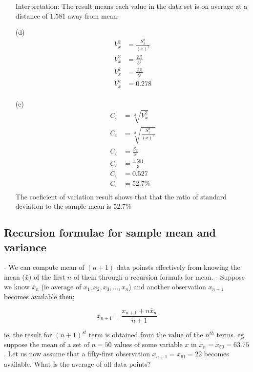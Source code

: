 \documentclass[12pt]{article}
\begin{document}
\begin{enumerate}
        Interpretation: The result means each value in the data set is on average at a distance of $1.581$ away from mean.
    \item[(d)]
        \begin{align*}
            V_x^2 & = \frac{S_x^2}{(\bar{x})^2} \\
            V_x^2 & = \frac{2.5}{3^2}           \\
            V_x^2 & = \frac{2.5}{9}             \\
            V_x^2 & = 0.278                     \\
        \end{align*}
    \item[(e)]
        \begin{align*}
            C_v & = \sqrt[2]{V_x^2}                     \\
            C_v & = \sqrt[2]{\frac{S_x^2}{(\bar{x})^2}} \\
            C_v & = \frac{S_x}{\bar{x}}                 \\
            C_v & = \frac{1.581}{3}                     \\
            C_v & = 0.527                               \\
            C_v & = 52.7\%                              \\
        \end{align*}
        The coeficient of variation result shows that that the ratio of standard deviation to the sample mean is $52.7\%$
\end{enumerate}
\subsection{Recursion formulae for sample mean and variance}
- We can compute mean of $(n + 1)$ data poinsts effectively from knowing the mean ($\bar{x}$) of the first $n$ of them through a recursion formula for mean.
- Suppose we know $\bar{x}_{n}$ (ie average of $x_1, x_2, x_3, \dots, x_n$) and another observation $x_{n+1}$ becomes available then;

\begin{equation}
    \bar{x}_{n + 1} = \frac{x_{n+1} + n\bar{x}_n}{n + 1}
\end{equation}

ie, the result for $(n + 1)^{st}$ term is obtained from the value of the $n^{th}$ terms.
eg. suppose the mean of a set of $n = 50$ values of some variable $x$ in $\bar{x}_n = \bar{x}_{50} = 63.75$. Let us now assume that a fifty-first observation $x_{n + 1} = x_{61} = 22$ becomes available. What is the average of all data points?
\end{document}
